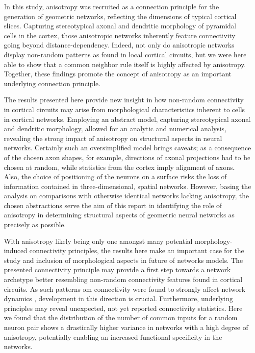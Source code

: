 In this study, anisotropy was recruited as a connection principle for
the generation of geometric networks, reflecting the dimensions of
typical cortical slices. Capturing stereotypical axonal and dendritic
morphology of pyramidal cells in the cortex, those anisotropic
networks inherently feature connectivity going beyond
distance-dependency. Indeed, not only do anisotropic networks display
non-random patterns as found in local cortical circuits, but we were
here able to show that a common neighbor rule itself is highly
affected by anisotropy. Together, these findings promote the concept
of anisotropy as an important underlying connection principle.

The results presented here provide new insight in how non-random
connectivity in cortical circuits may arise from morphological
characteristics inherent to cells in cortical networks. Employing an
abstract model, capturing stereotypical axonal and dendritic
morphology, allowed for an analytic and numerical analysis, revealing
the strong impact of anisotropy on structural aspects in neural
networks. Certainly such an oversimplified model brings caveats; as a
consequence of the chosen axon shapes, for example, directions of
axonal projections had to be chosen at random, while statistics from
the cortex imply alignment of axons. Also, the choice of positioning
of the neurons on a surface risks the loss of information contained in
three-dimensional, spatial networks. However, basing the analysis on
comparisons with otherwise identical networks lacking anisotropy, the
chosen abstractions serve the aim of this report in identifying the
role of anisotropy in determining structural aspects of geometric
neural networks as precisely as possible.

With anisotropy likely being only one amongst many potential
morpho\-logy-induced connectivity principles, the results here make an
important case for the study and inclusion of morphological aspects in
future of networks models. The presented connectivity principle may
provide a first step towards a network archetype better resembling
non-random connectivity features found in cortical circuits. As such
patterns om connectivity were found to strongly affect network
dynamics \parencite{Pernice2011, Zhao2011}, development in this
direction is crucial. Furthermore, underlying principles may reveal
unexpected, not yet reported connectivity statistics. Here we found
that the distribution of the number of common inputs for a random
neuron pair shows a drastically higher variance in networks with a
high degree of anisotropy, potentially enabling an increased
functional specificity in the networks.

